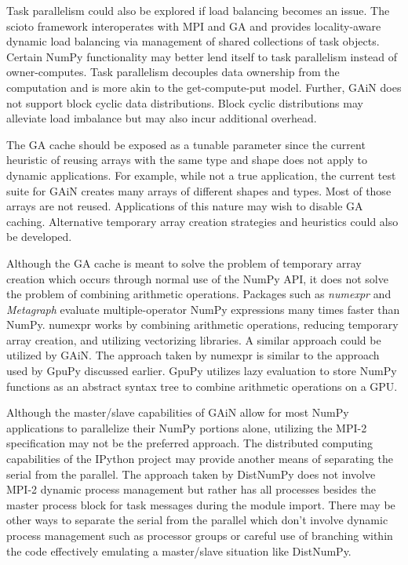 \documentclass{sigplanconf}
\begin{document}
Task parallelism could also be explored if load balancing becomes an issue.
The scioto framework \cite{Din08} interoperates with MPI and GA and provides
locality-aware dynamic load balancing via management of shared collections of
task objects. Certain NumPy functionality may better lend itself to task
parallelism instead of owner-computes. Task parallelism decouples data
ownership from the computation and is more akin to the get-compute-put model.
Further, GAiN does not support block cyclic data distributions. Block cyclic
distributions may alleviate load imbalance but may also incur additional
overhead.

The GA cache should be exposed as a tunable parameter since the current
heuristic of reusing arrays with the same type and shape does not apply to
dynamic applications. For example, while not a true application, the current
test suite for GAiN creates many arrays of different shapes and types. Most of
those arrays are not reused. Applications of this nature may wish to disable
GA caching.  Alternative temporary array creation strategies and heuristics
could also be developed.

Although the GA cache is meant to solve the problem of temporary array
creation which occurs through normal use of the NumPy API,  it does not solve
the problem of combining arithmetic operations. Packages such as
\emph{numexpr} \cite{Coo11} and \emph{Metagraph} \cite{Wan11} evaluate
multiple-operator NumPy expressions many times faster than NumPy. numexpr
works by combining arithmetic operations, reducing temporary array creation,
and utilizing vectorizing libraries. A similar approach could be utilized by
GAiN. The approach taken by numexpr is similar to the approach used by GpuPy
discussed earlier. GpuPy utilizes lazy evaluation to store NumPy functions as
an abstract syntax tree to combine arithmetic operations on a GPU.

Although the master/slave capabilities of GAiN allow for most NumPy
applications to parallelize their NumPy portions alone, utilizing the MPI-2
specification may not be the preferred approach. The distributed computing
capabilities of the IPython project may provide another means of separating
the serial from the parallel. The approach taken by DistNumPy does not
involve MPI-2 dynamic process management but rather has all processes besides
the master process block for task messages during the module import. There may
be other ways to separate the serial from the parallel which don't involve
dynamic process management such as processor groups or careful use of
branching within the code effectively emulating a master/slave situation like
DistNumPy.
\end{document}
